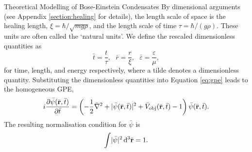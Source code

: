\begin{chapter}{\label{cha:theoretical_model}Theoretical Modelling of Bose-Einstein Condensates}
		By dimensional arguments (see Appendix \ref{section:healing} for details), the length scale of space is the healing length, $\xi = \hbar/\sqrt{mg\rho}$, and the length scale of time $\tau = \hbar/(g\rho)$. These units are often called the `natural units'. We define the rescaled dimensionless quantities as
		\begin{equation}
			\bar{t} = \frac{t}{\tau}, ~~~ \bar{r} = \frac{r}{\xi}, ~~~ \bar{\varepsilon} = \frac{\varepsilon}{\mu},
		\end{equation}
		for time, length, and energy respectively, where a tilde denotes a dimensionless quantity. Substituting the dimensionless quantities into Equation \ref{eq:gpe} leads to the homogeneous GPE,
		\begin{equation}\label{eq:dimgpehomg}
		i\frac{\partial\bar{\psi}({\bar{\bf r}},\bar{t})}{\partial {\bar{t}}} = \left( -\frac{1}{2}\bar{\nabla}^2 + |\bar{\psi}({\bar{\bf r}},\bar{t})|^2 + \bar{V}_{\mathrm{obj}}({\bar{\bf r}},\bar{t}) - 1 \right) \bar{\psi}({\bar{\bf r}},\bar{t}).
		\end{equation}
		The resulting normalisation condition for $\bar{\psi}$ is
		\begin{equation}\label{eq:intwfhomg}
			\int \! |\bar{\psi}|^2 \, \mathrm{d}^3\bar{\bf r} = 1.
		\end{equation}


\end{chapter}

